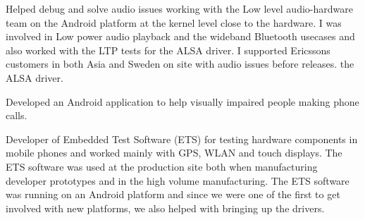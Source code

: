 \documentclass{article}
\begin{document}


\sepspace


\sepspace

  {Helped debug and solve audio issues working with the Low level
    audio-hardware team on the Android platform at the kernel level close to
    the hardware. I was involved in Low power audio playback and the wideband
    Bluetooth usecases and also worked with the LTP tests for the ALSA driver. 
  I supported Ericssons customers in both Asia and Sweden on site with audio
  issues before releases. 
  the ALSA driver.}
\sepspace

{Developed an Android application to help visually impaired people making
  phone calls.} 
\sepspace

  {Developer of Embedded Test Software (ETS) for testing hardware components in
    mobile phones and worked mainly with GPS, WLAN and touch displays. The ETS
    software was used at the production site both when manufacturing developer
    prototypes and in the high volume manufacturing. The ETS software was
    running on an Android platform and since we were one of the first to get
    involved with new platforms, we also helped with bringing up the drivers.}
\sepspace
\end{document}
